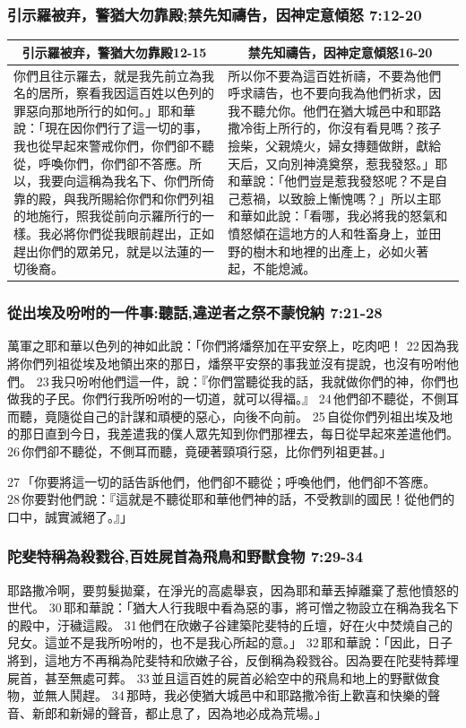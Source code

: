 \subsubsection{引示羅被弃，警猶大勿靠殿;禁先知禱告，因神定意傾怒 7:12-20}
\begin{table}[H]
\centering
\begin{tabular}{p{8.25cm}|p{8.750cm}}\hline\hline
\multicolumn{1}{c|}{引示羅被弃，警猶大勿靠殿12-15}&\multicolumn{1}{c}{禁先知禱告，因神定意傾怒16-20}\\\hline
你們且往示羅去，就是我先前立為我名的居所，察看我因這百姓以色列的罪惡向那地所行的如何。」耶和華說：「現在因你們行了這一切的事，我也從早起來警戒你們，你們卻不聽從，呼喚你們，你們卻不答應。所以，我要向這稱為我名下、你們所倚靠的殿，與我所賜給你們和你們列祖的地施行，照我從前向示羅所行的一樣。我必將你們從我眼前趕出，正如趕出你們的眾弟兄，就是以法蓮的一切後裔。
&所以你不要為這百姓祈禱，不要為他們呼求禱告，也不要向我為他們祈求，因我不聽允你。他們在猶大城邑中和耶路撒冷街上所行的，你沒有看見嗎？孩子撿柴，父親燒火，婦女摶麵做餅，獻給天后，又向別神澆奠祭，惹我發怒。」耶和華說：「他們豈是惹我發怒呢？不是自己惹禍，以致臉上慚愧嗎？」所以主耶和華如此說：「看哪，我必將我的怒氣和憤怒傾在這地方的人和牲畜身上，並田野的樹木和地裡的出產上，必如火著起，不能熄滅。\\\hline
\end{tabular}
\end{table}



\subsubsection{從出埃及吩咐的一件事:聽話,違逆者之祭不蒙悅納 7:21-28}
萬軍之耶和華以色列的神如此說：「你們將燔祭加在平安祭上，吃肉吧！ 22 因為我將你們列祖從埃及地領出來的那日，燔祭平安祭的事我並沒有提說，也沒有吩咐他們。 23 我只吩咐他們這一件，說：『你們當聽從我的話，我就做你們的神，你們也做我的子民。你們行我所吩咐的一切道，就可以得福。』 24 他們卻不聽從，不側耳而聽，竟隨從自己的計謀和頑梗的惡心，向後不向前。 25 自從你們列祖出埃及地的那日直到今日，我差遣我的僕人眾先知到你們那裡去，每日從早起來差遣他們。 26 你們卻不聽從，不側耳而聽，竟硬著頸項行惡，比你們列祖更甚。」

27 「你要將這一切的話告訴他們，他們卻不聽從；呼喚他們，他們卻不答應。 28 你要對他們說：『這就是不聽從耶和華他們神的話，不受教訓的國民！從他們的口中，誠實滅絕了。』」

\subsubsection{陀斐特稱為殺戮谷,百姓屍首為飛鳥和野獸食物 7:29-34}
耶路撒冷啊，要剪髮拋棄，在淨光的高處舉哀，因為耶和華丟掉離棄了惹他憤怒的世代。 30 耶和華說：「猶大人行我眼中看為惡的事，將可憎之物設立在稱為我名下的殿中，汙穢這殿。 31 他們在欣嫩子谷建築陀斐特的丘壇，好在火中焚燒自己的兒女。這並不是我所吩咐的，也不是我心所起的意。」 32 耶和華說：「因此，日子將到，這地方不再稱為陀斐特和欣嫩子谷，反倒稱為殺戮谷。因為要在陀斐特葬埋屍首，甚至無處可葬。 33 並且這百姓的屍首必給空中的飛鳥和地上的野獸做食物，並無人鬨趕。 34 那時，我必使猶大城邑中和耶路撒冷街上歡喜和快樂的聲音、新郎和新婦的聲音，都止息了，因為地必成為荒場。」



